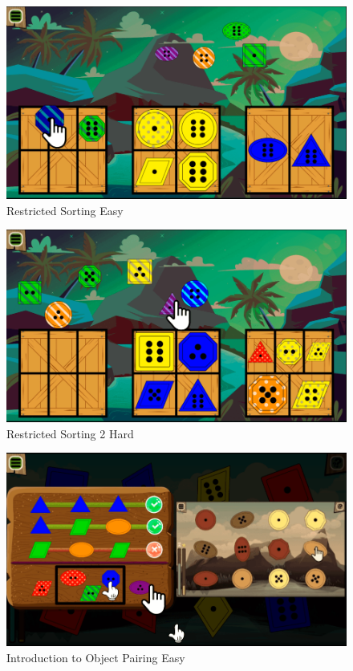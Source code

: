\begin{figure}[H]
    \centering
    \includegraphics[width=1\textwidth]{figures/restricted1}
    \caption{Restricted Sorting Easy}
    \label{fig:restricted1}
\end{figure}

\begin{figure}[H]
    \centering
    \includegraphics[width=1\textwidth]{figures/restricted2}
    \caption{Restricted Sorting 2 Hard}
    \label{fig:restricted2}
\end{figure}

\begin{figure}[H]
    \centering
    \includegraphics[width=1\textwidth]{figures/introgame}
    \caption{Introduction to Object Pairing Easy}
    \label{fig:introgame}
\end{figure}

